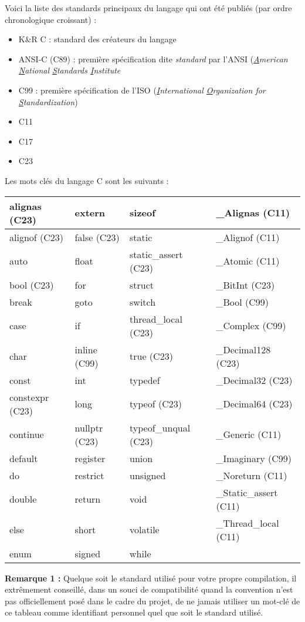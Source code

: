 \documentclass[../../../main.tex]{subfiles}
\begin{document}
Voici la liste des standards principaux du langage qui ont été publiés (par ordre chronologique croissant) :
\begin{itemize}
	\item K$\&$R C : standard des créateurs du langage
	\item ANSI-C (C89) : première spécification dite \textit{standard} par l'ANSI (\textit{\underline{A}merican \underline{N}ational \underline{S}tandards \underline{I}nstitute}
	\item C99 : première spécification de l'ISO (\textit{\underline{I}nternational \underline{O}rganization for \underline{S}tandardization})
	\item C11
	\item C17
	\item C23
\end{itemize}
Les mots clés du langage C sont les suivants :
\begin{center}
\begin{tabular}{|l|l|l|l|}
\hline alignas (C23) & extern & sizeof & \_Alignas (C11) \\
\hline alignof (C23) & false (C23) & static & \_Alignof (C11) \\
\hline auto & float & static\_assert (C23) & \_Atomic (C11) \\
\hline bool (C23) & for & struct & \_BitInt (C23) \\
\hline break & goto & switch & \_Bool (C99) \\
\hline case & if & thread\_local (C23) & \_Complex (C99) \\
\hline char & inline (C99) & true (C23) & \_Decimal128 (C23) \\
\hline const & int & typedef & \_Decimal32 (C23) \\
\hline constexpr (C23) & long & typeof (C23) &\_Decimal64 (C23) \\
\hline continue & nullptr (C23) & typeof\_unqual (C23) & \_Generic (C11) \\
\hline default & register & union & \_Imaginary (C99) \\
\hline do & restrict & unsigned & \_Noreturn (C11) \\
\hline double & return & void & \_Static\_assert (C11) \\
\hline else & short & volatile & \_Thread\_local (C11) \\
\hline enum & signed & while \\
\hline
\end{tabular}
\end{center}
\textbf{Remarque 1 :} Quelque soit le standard utilisé pour votre propre compilation, il extrêmement conseillé, dans un souci de compatibilité quand la convention n'est pas officiellement posé dans le cadre du projet, de ne jamais utiliser un mot-clé de ce tableau comme identifiant personnel quel que soit le standard utilisé.
 
\end{document}
